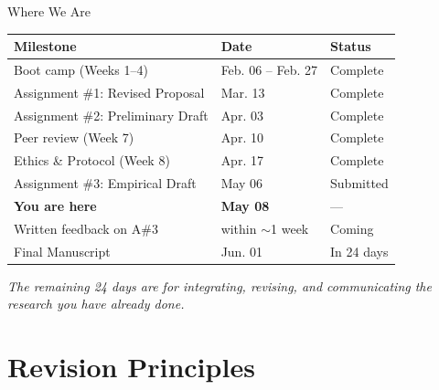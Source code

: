 \documentclass[aspectratio=169,11pt]{beamer}
\begin{document}
\begin{frame}{Where We Are}
    \begin{table}
        \footnotesize
        \begin{tabular}{lll}
            \toprule
            \textbf{Milestone} & \textbf{Date} & \textbf{Status} \\
            \midrule
            Boot camp (Weeks 1--4) & Feb. 06 -- Feb. 27 & \textcolor{SageGreen}{Complete} \\
            Assignment \#1: Revised Proposal & Mar. 13 & \textcolor{SageGreen}{Complete} \\
            Assignment \#2: Preliminary Draft & Apr. 03 & \textcolor{SageGreen}{Complete} \\
            Peer review (Week 7) & Apr. 10 & \textcolor{SageGreen}{Complete} \\
            Ethics \& Protocol (Week 8) & Apr. 17 & \textcolor{SageGreen}{Complete} \\
            Assignment \#3: Empirical Draft & May 06 & \textcolor{SageGreen}{Submitted} \\
            \textbf{You are here} & \textbf{May 08} & --- \\
            Written feedback on A\#3 & within $\sim$1 week & \textcolor{Terracotta}{Coming} \\
            Final Manuscript & Jun. 01 & \textcolor{Terracotta}{In 24 days} \\
            \bottomrule
        \end{tabular}
    \end{table}
    \vspace{0.3cm}
    \begin{center}
        \itshape The remaining 24 days are for integrating, revising, and communicating the research you have already done.
    \end{center}
\end{frame}

\section{Revision Principles}
\end{document}
